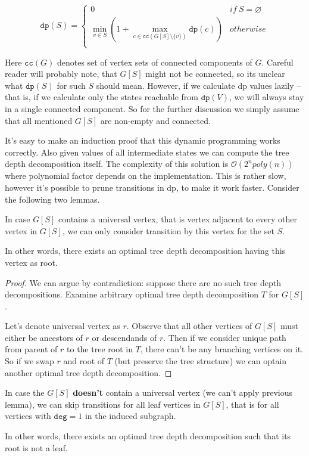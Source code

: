 \documentclass[a4paper,UKenglish,cleveref, autoref, thm-restate]{lipics-v2019}
\begin{document}
$$\texttt{dp}(S) = \begin{cases}
  0 & if~S = \varnothing \\
  \min_{v \in S} (1 + \max\limits_{c \in \texttt{cc}(G[S] \setminus \{v\})} \texttt{dp}(c)) & otherwise \\
\end{cases}
$$

Here $\texttt{cc}(G)$ denotes set of vertex sets of connected components of $G$. Careful reader will
probably note, that $G[S]$ might not be connected, so its unclear what $\texttt{dp}(S)$ for such $S$
should mean. However, if we calculate dp values lazily -- that is, if we calculate only the states
reachable from $\texttt{dp}(V)$, we will always stay in a single connected component. So for the
further discussion we simply assume that all mentioned $G[S]$ are non-empty and connected.

It's easy to make an induction proof that this dynamic programming works correctly.
Also given values of all intermediate states we can compute the tree depth decomposition itself.
The complexity of this solution is $\mathcal{O}(2^n poly(n))$ where polynomial factor depends on the implementation.
This is rather slow, however it's possible to prune transitions in dp, to make it work faster. Consider the following
two lemmas.

\begin{lemma} In case $G[S]$ contains a universal vertex, that is vertex adjacent to every other vertex in $G[S]$, we
  can only consider transition by this vertex for the set $S$.

  In other words, there exists an optimal tree depth decomposition having this vertex as root.
\end{lemma}

\begin{proof} We can argue by contradiction: suppose there are no such tree depth decompositions. Examine
  arbitrary optimal tree depth decomposition $T$ for $G[S]$.

  Let's denote universal vertex as $r$. Observe that all other vertices of $G[S]$ must either be ancestors of $r$ or
  descendands of $r$. Then if we consider unique path from parent of $r$ to the tree root in $T$, there can't be any branching
  vertices on it. So if we swap $r$ and root of $T$ (but preserve the tree structure) we can optain another optimal tree depth decomposition.
\end{proof}

\begin{lemma} In case the $G[S]$ \textbf{doesn't} contain a universal vertex (we can't apply previous lemma), we can skip
  transitions for all leaf vertices in $G[S]$, that is for all vertices with $\texttt{deg} = 1$ in the induced subgraph.

  In other words, there exists an optimal tree depth decomposition such that its root is not a leaf.
\end{lemma}
\end{document}

